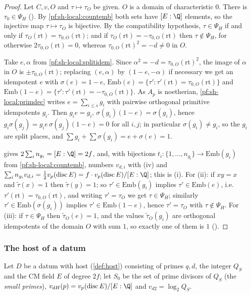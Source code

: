 \begin{proof}
Let $C,v,O$ and $\tau\mapsto\tau_O$ be given. $O$ is a domain of characteristic $0$. There is $\tau_0\in\Psi_H$
(). By \cref{pf:sh-local:countemb} both sets have $[E:\Q]$
elements, so the injective map $\tau\mapsto\tau_O$ is bijective. By the compatibility hypothesis,
$\tau\in\Psi_H$ if and only if $\tau_O(\mathrm{rt})=\tau_{0,O}(\mathrm{rt})$; and if
$\tau_O(\mathrm{rt})=-\tau_{0,O}(\mathrm{rt})$ then $\tau\notin\Psi_H$, for otherwise
$2\tau_{0,O}(\mathrm{rt})=0$, whereas $\tau_{0,O}(\mathrm{rt})^2=-d\ne0$ in $O$.

Take $e,\alpha$ from \cref{pf:sh-local:splitidem}. Since $\alpha^2=-d=\tau_{0,O}(\mathrm{rt})^2$, the image of $\alpha$ in
$O$ is $\pm\tau_{0,O}(\mathrm{rt})$; replacing $(e,\alpha)$ by $(1-e,-\alpha)$ if necessary we get an idempotent $e$ with
$\sigma(e)=1-e$, $\mathrm{Emb}(e)=\{\tau':\tau'(\mathrm{rt})=\tau_{0,O}(\mathrm{rt})\}$ and
$\mathrm{Emb}(1-e)=\{\tau':\tau'(\mathrm{rt})=-\tau_{0,O}(\mathrm{rt})\}$. As $A_p$ is noetherian,
\cref{pf:sh-local:primdec} writes $e=\sum_{i\le s}g_i$ with pairwise orthogonal primitive idempotents $g_i$. Then
$g_ie=g_i$, $\sigma(g_i)(1-e)=\sigma(g_i)$, hence $g_i\sigma(g_j)=g_ie\,\sigma(g_j)(1-e)=0$ for all $i,j$; in
particular $\sigma(g_i)\ne g_i$, so the $g_i$ are split places, and $\sum g_i+\sum\sigma(g_i)=e+\sigma(e)=1$.

 gives $2\sum_in_{g_i}=[E:\Q]=2f$, and, with bijections
$t_i:\{1,\dots,n_{g_i}\}\to\mathrm{Emb}(g_i)$ from \cref{pf:sh-local:countemb}, numbers $v_{d,i}$ with (iv) and
$\sum_in_{g_i}v_{d,i}=\frac12v_p(\mathrm{disc}\,E)=f\cdot v_p(\mathrm{disc}\,E)/[E:\Q]$; this is (i). For (ii): if
$xy=x$ and $\tilde\tau(x)=1$ then $\tilde\tau(y)=1$; so $\tau'\in\mathrm{Emb}(g_i)$ implies $\tau'\in\mathrm{Emb}(e)$,
i.e. $\tau'(\mathrm{rt})=\tau_{0,O}(\mathrm{rt})$, and writing $\tau'=\tau_O$ we get $\tau\in\Psi_H$; similarly
$\tau'\in\mathrm{Emb}(\sigma(g_i))$ implies $\tau'\in\mathrm{Emb}(1-e)$, hence $\tau'=\tau_O$ with $\tau\notin\Psi_H$.
For (iii): if $\tau\in\Psi_H$ then $\tilde\tau_O(e)=1$, and the values $\tilde\tau_O(g_i)$ are orthogonal idempotents of
the domain $O$ with sum $1$, so exactly one of them is $1$ ().
\end{proof}

\subsubsection{The host of a datum}
Let $D$ be a datum with host (\cref{def:host}) consisting of primes $q,d$, the integer $Q_S$ and the CM field $E$ of
degree $2f$; let $S_0$ be the set of prime divisors of $Q_S$ (the \emph{small primes}),
$v_{dH}(p)=v_p(\mathrm{disc}\,E)/[E:\Q]$ and $v_{d2}=\log_2Q_S$.

